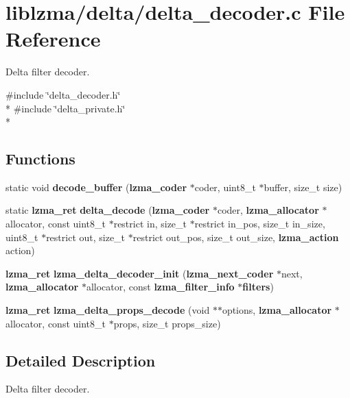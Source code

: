 \section{liblzma/delta/delta\-\_\-decoder.c File Reference}
\label{delta__decoder_8c}


Delta filter decoder.  


{\ttfamily \#include \char`\"{}delta\-\_\-decoder.\-h\char`\"{}}\\*
{\ttfamily \#include \char`\"{}delta\-\_\-private.\-h\char`\"{}}\\*
\subsection*{Functions}
\begin{DoxyCompactItemize}
\item 
static void {\bfseries decode\-\_\-buffer} ({\bf lzma\-\_\-coder} $\ast$coder, uint8\-\_\-t $\ast$buffer, size\-\_\-t size)\label{delta__decoder_8c_acf608b7c3273f43f502d5e98136ec20a}

\item 
static {\bf lzma\-\_\-ret} {\bfseries delta\-\_\-decode} ({\bf lzma\-\_\-coder} $\ast$coder, {\bf lzma\-\_\-allocator} $\ast$allocator, const uint8\-\_\-t $\ast$restrict in, size\-\_\-t $\ast$restrict in\-\_\-pos, size\-\_\-t in\-\_\-size, uint8\-\_\-t $\ast$restrict out, size\-\_\-t $\ast$restrict out\-\_\-pos, size\-\_\-t out\-\_\-size, {\bf lzma\-\_\-action} action)\label{delta__decoder_8c_a078e3568c271368fed2f513d25d85b81}

\item 
{\bf lzma\-\_\-ret} {\bfseries lzma\-\_\-delta\-\_\-decoder\-\_\-init} ({\bf lzma\-\_\-next\-\_\-coder} $\ast$next, {\bf lzma\-\_\-allocator} $\ast$allocator, const {\bf lzma\-\_\-filter\-\_\-info} $\ast${\bf filters})\label{delta__decoder_8c_a642840eca8bd7b718484489f5a12d2b7}

\item 
{\bf lzma\-\_\-ret} {\bfseries lzma\-\_\-delta\-\_\-props\-\_\-decode} (void $\ast$$\ast$options, {\bf lzma\-\_\-allocator} $\ast$allocator, const uint8\-\_\-t $\ast$props, size\-\_\-t props\-\_\-size)\label{delta__decoder_8c_a320310c36c7aacae2f05e27a27ad0e7c}

\end{DoxyCompactItemize}


\subsection{Detailed Description}
Delta filter decoder. 
